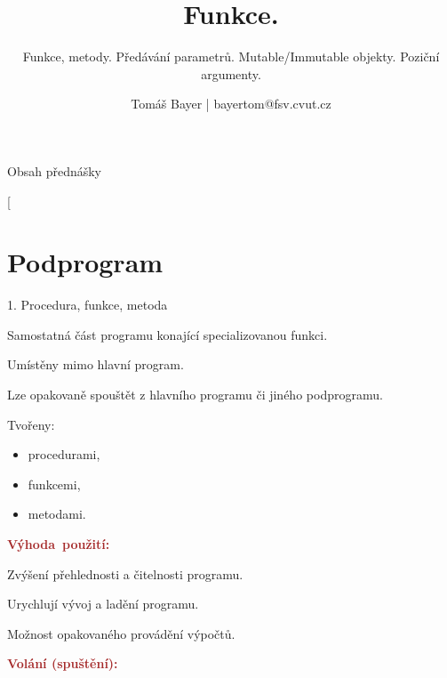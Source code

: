 \documentclass[czech]{beamer}
\date{}
\makeatletter
\newcommand\makebeamertitle{\frame{\maketitle}}%
\let\origtableofcontents=\tableofcontents
\def\tableofcontents{\@ifnextchar[{\origtableofcontents}{\gobbletableofcontents}}
\def\gobbletableofcontents#1{\origtableofcontents}
\makeatother
\begin{document}
\title{Funkce.}
\subtitle{Funkce, metody. Předávání parametrů. Mutable/Immutable objekty. Poziční
argumenty.}
\author{Tomáš Bayer | bayertom@fsv.cvut.cz}
\makebeamertitle
\begin{frame}{Obsah přednášky}

\tableofcontents{}
\end{frame}


\section{Podprogram}
\begin{frame}{1. Procedura, funkce, metoda}

{\scriptsize Samostatná část programu konající specializovanou funkci. }{\scriptsize\par}

{\scriptsize Umístěny mimo hlavní program.}{\scriptsize\par}

{\scriptsize Lze opakovaně spouštět z hlavního programu či jiného podprogramu.\medskip{}
}{\scriptsize\par}

{\scriptsize Tvořeny: }{\scriptsize\par}
\begin{itemize}
\item {\scriptsize procedurami, }{\scriptsize\par}
\item {\scriptsize funkcemi, }{\scriptsize\par}
\item {\scriptsize metodami.\medskip{}
}{\scriptsize\par}
\end{itemize}
{\scriptsize\textbf{\textcolor{brown}{Výhoda~použití: }}}{\scriptsize\par}

{\scriptsize Zvýšení přehlednosti a čitelnosti programu.}{\scriptsize\par}

{\scriptsize Urychlují vývoj a ladění programu.}{\scriptsize\par}

{\scriptsize Možnost opakovaného provádění výpočtů.\bigskip{}
}{\scriptsize\par}

{\scriptsize\textbf{\textcolor{brown}{Volání (spuštění):}}}{\scriptsize\par}


\end{frame}
\end{document}
